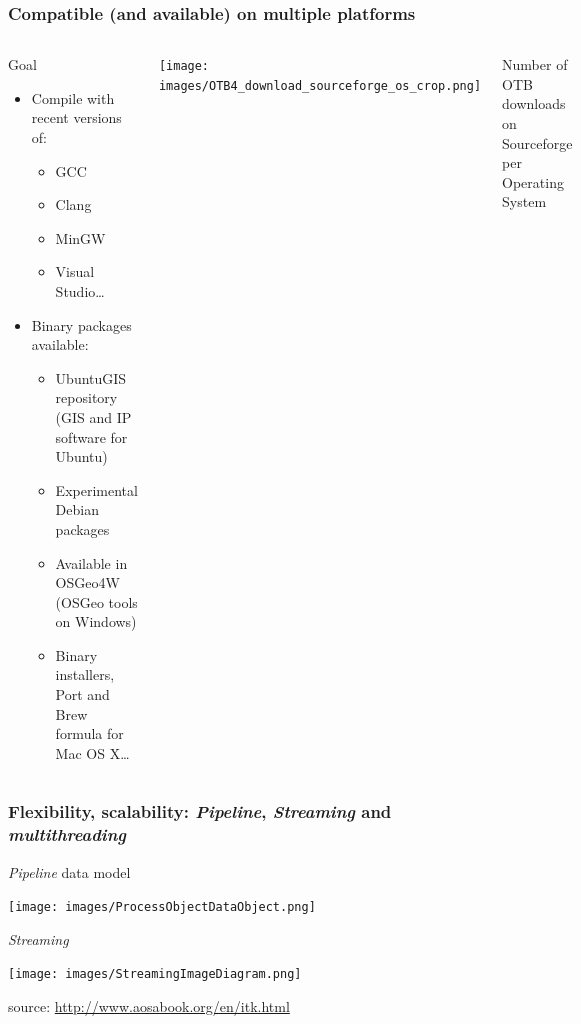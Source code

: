 \documentclass[8pt]{beamer}
\begin{document}
\begin{frame}
\frametitle{Compatible (and available) on multiple platforms}
\begin{columns}
\begin{block}{Goal}
\begin{itemize}
\item Compile with recent versions of:
\begin{itemize}
\item GCC
\item Clang
\item MinGW
\item Visual Studio\ldots
\end{itemize}
\item Binary packages available:
\begin{itemize}
\item UbuntuGIS repository (GIS and IP software for Ubuntu)
\item Experimental Debian packages
\item Available in  OSGeo4W (OSGeo tools on Windows)
\item Binary installers, Port and Brew formula for Mac OS X\ldots
\end{itemize}
\end{itemize}
\end{block}
\texttt{[image: images/OTB4\_download\_sourceforge\_os\_crop.png]}
\begin{center}
\tiny{Number of OTB downloads on Sourceforge per Operating System}
\end{center}
\end{columns}
\end{frame}

\begin{frame}
\frametitle{Flexibility, scalability: \textit{Pipeline}, \textit{Streaming} and \textit{multithreading}}

\begin{block}{\textit{Pipeline} data model}
\begin{center}
\texttt{[image: images/ProcessObjectDataObject.png]}
\end{center}
\end{block}
\vspace{-0.5cm}
\begin{block}{\textit{Streaming}}
\begin{center}
\texttt{[image: images/StreamingImageDiagram.png]}
\end{center}
\end{block}
\vspace{-0.5cm}
\begin{center}
\tiny{source: \url{http://www.aosabook.org/en/itk.html}}
\end{center}
\end{frame}
\end{document}
